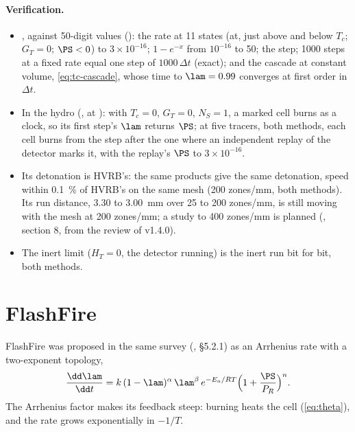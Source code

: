 \paragraph{Verification.}
\begin{itemize}
\item {}, against 50-digit values ():
  the rate at 11 states (at, just above and below $T_c$; $G_T = 0$; $\PS <
  0$) to $3\times 10^{-16}$; $1 - e^{-x}$ from $10^{-16}$ to 50; the step;
  1000 steps at a fixed rate equal one step of $1000\,\Delta t$ (exact); and the cascade at constant volume,
  \cref{eq:tc-cascade}, whose time to $\lam = 0.99$ converges at first order
  in $\Delta t$.
\item In the hydro (, at
  ): with $T_c = 0$, $G_T = 0$, $N_S = 1$, a marked cell burns
  as a clock, so its first step's $\lam$ returns $\PS$; at five tracers, both
  methods, each cell burns from the step after the one where an independent
  replay of the detector marks it, with the replay's $\PS$ to $3\times
  10^{-16}$.
\item Its detonation is HVRB's: the same products give the same detonation,
  speed within 0.1~\% of HVRB's on the same mesh (200 zones/mm, both
  methods). Its run distance, 3.30 to 3.00~mm over 25 to 200 zones/mm,
  is still moving with the mesh at 200 zones/mm; a study to 400 zones/mm is
  planned (, section 8, from the review of v1.4.0).
\item The inert limit ($H_T = 0$, the detector running) is the inert run bit
  for bit, both methods.
\end{itemize}

\section{FlashFire}
\label{sec:flashfire}

FlashFire was proposed in the same survey (\cite{kittell2025sand}, \S 5.2.1)
as an Arrhenius rate with a two-exponent topology,
\begin{equation*}
  \frac{\dd\lam}{\dd t} = k\,(1 - \lam)^{\alpha}\,\lam^{\beta}\,
  e^{-E_a/RT}\Bigl(1 + \frac{\PS}{P_R}\Bigr)^{n}.
\end{equation*}
The Arrhenius factor makes its feedback steep: burning heats the cell
(\cref{eq:theta}), and the rate grows exponentially in $-1/T$.

